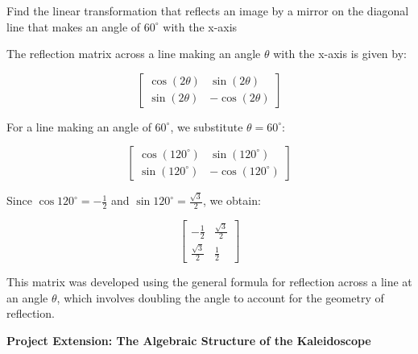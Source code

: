 \documentclass{ximera}
\begin{document}
    \begin{problem}
    Find the linear transformation that reflects an image by a mirror on the diagonal line that makes an angle of $60^\circ$ with the x-axis

     \vspace{0.3cm}

    The reflection matrix across a line making an angle $\theta$ with the x-axis is given by:

\[
\begin{bmatrix}
\cos(2\theta) & \sin(2\theta) \\
\sin(2\theta) & -\cos(2\theta)
\end{bmatrix}
\]

   \vspace{0.3cm}
   
For a line making an angle of $60^\circ$, we substitute $\theta = 60^\circ$:

\[
\begin{bmatrix}
\cos(120^\circ) & \sin(120^\circ) \\
\sin(120^\circ) & -\cos(120^\circ)
\end{bmatrix}
\]

   \vspace{0.3cm}

Since $\cos 120^\circ = -\frac{1}{2}$ and $\sin120^\circ = \frac{\sqrt{3}}{2}$, we obtain:

\[
\begin{bmatrix}
-\frac{1}{2} & \frac{\sqrt{3}}{2} \\
\frac{\sqrt{3}}{2} & \frac{1}{2}
\end{bmatrix}
\]

  \vspace{0.3cm}
  
This matrix was developed using the general formula for reflection across a line at an angle $\theta$, which involves doubling the angle to account for the geometry of reflection.
    \end{problem}

    \vspace{0.6cm}

\begin{center}
    \textbf{Project Extension: The Algebraic Structure of the Kaleidoscope\\}
\end{center}
\end{document}
